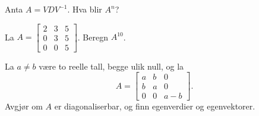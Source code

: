 \begin{oppgave}
Anta $A=VDV^{-1}$. 
Hva blir $A^n$? 
\end{oppgave}

\begin{oppgave}
La
$A=\begin{bmatrix}
2 & 3 & 5\\
0 & 3 & 5\\
0 & 0 & 5
\end{bmatrix}$. Beregn $A^{10}$.
\end{oppgave}


\begin{oppgave}
La $ a\neq b$ være to reelle tall, begge ulik null, og la
$$A=
\begin{bmatrix}
a & b & 0\\
b & a & 0\\
0 & 0 & a-b
\end{bmatrix}.$$
Avgjør om $A$ er diagonaliserbar, og finn egenverdier og egenvektorer.
\end{oppgave}

%
%
%
%
%
%
%


